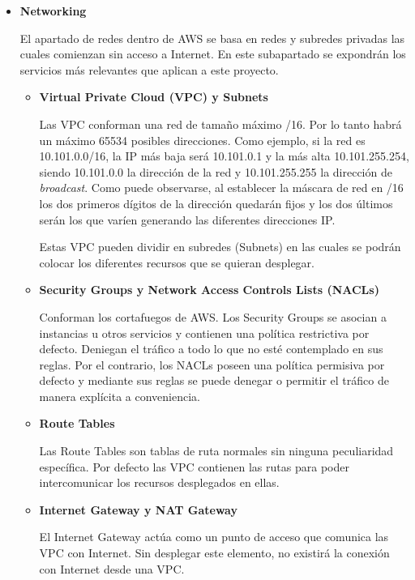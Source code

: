 \documentclass[../../memoria.tex]{subfiles}
\begin{document}
\begin{itemize}
      \item \textbf{Networking}
            \par
            El apartado de redes dentro de AWS se basa en redes y subredes privadas las cuales comienzan sin acceso a Internet. En este subapartado se expondrán los servicios más relevantes que aplican a este proyecto.
            \begin{itemize}
                  \item \textbf{Virtual Private Cloud (VPC) y Subnets}
                        \par
                        Las VPC conforman una red de tamaño máximo /16. Por lo tanto habrá un máximo 65534 posibles direcciones. Como ejemplo, si la red es 10.101.0.0/16, la IP más baja será 10.101.0.1 y la más alta 10.101.255.254, siendo 10.101.0.0 la dirección de la red y 10.101.255.255 la dirección de \textit{broadcast}. Como puede observarse, al establecer la máscara de red en /16 los dos primeros dígitos de la dirección quedarán fijos y los dos últimos serán los que varíen generando las diferentes direcciones IP.

                        Estas VPC pueden dividir en subredes (Subnets) en las cuales se podrán colocar los diferentes recursos que se quieran desplegar.
                  \item \textbf{Security Groups y Network Access Controls Lists (NACLs)}
                        \par
                        Conforman los cortafuegos de AWS. Los Security Groups se asocian a instancias u otros servicios y contienen una política restrictiva por defecto. Deniegan el tráfico a todo lo que no esté contemplado en sus reglas. Por el contrario, los NACLs poseen una política permisiva por defecto y mediante sus reglas se puede denegar o permitir el tráfico de manera explícita a conveniencia.
                  \item \textbf{Route Tables }
                        \par
                        Las Route Tables son tablas de ruta normales sin ninguna peculiaridad específica. Por defecto las VPC contienen las rutas para poder intercomunicar los recursos desplegados en ellas.
                  \item \textbf{Internet Gateway y NAT Gateway }
                        \par
                        El Internet Gateway actúa como un punto de acceso que comunica las VPC con Internet. Sin desplegar este elemento, no existirá la conexión con Internet desde una VPC.


\end{itemize}
\end{itemize}
\end{document}
